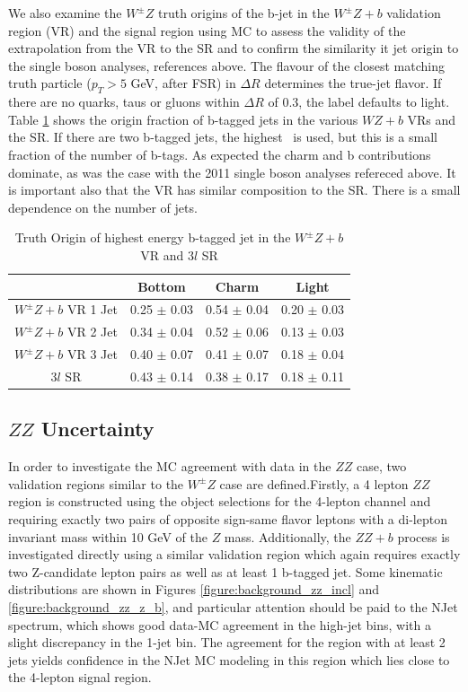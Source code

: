 We also examine the $W^{\pm}Z$ truth origins of the b-jet in the $W^{\pm}Z+b$ validation region (VR) and the signal region using MC to assess the validity of the extrapolation from the VR to the SR and to confirm the similarity it jet origin to the single boson analyses, references above. The flavour of the closest matching truth particle ($p_T > 5$ GeV, after FSR) in $\Delta R$ determines the true-jet flavor. If there are no quarks, taus or gluons within $\Delta R$ of 0.3, the label defaults to light.  Table \ref{table:wz_truth} shows the origin fraction of b-tagged jets in the various $WZ+b$ VRs and the SR. If there are two b-tagged jets, the highest \pt\ is used, but this is a small fraction of the number of b-tags. As expected the charm and b contributions dominate, as was the case with the 2011 single boson analyses refereced above. It is important also that the VR has similar composition to the SR.  There is a small dependence on the number of jets. 

\begin{table}[htbp]
\centering 
\begin{tabular}{|c|c|c|c|} 
  \hline
  & Bottom  & Charm & Light \\
  \hline
  $W^{\pm}Z+b$ VR 1 Jet& 0.25 $\pm$ 0.03 & 0.54  $\pm$ 0.04 & 0.20 $\pm$ 0.03 \\ 
  $W^{\pm}Z+b$ VR 2 Jet& 0.34 $\pm$ 0.04 & 0.52  $\pm$ 0.06 & 0.13 $\pm$ 0.03 \\ 
  $W^{\pm}Z+b$ VR 3 Jet& 0.40 $\pm$ 0.07 & 0.41  $\pm$ 0.07 & 0.18 $\pm$ 0.04 \\
  3$l$ SR              & 0.43 $\pm$ 0.14 & 0.38  $\pm$ 0.17 & 0.18 $\pm$ 0.11 \\
  \hline 
\end{tabular}
\caption{Truth Origin of highest energy b-tagged jet in the $W^{\pm}Z+b$ VR and 3$l$ SR} 
\label{table:wz_truth}
\end{table} 

\subsection{$ZZ$ Uncertainty}

In order to investigate the MC agreement with data in the $ZZ$ case, two validation regions similar to the $W^{\pm}Z$ case are defined.Firstly, a 4 lepton $ZZ$ region is constructed using the object selections for the 4-lepton channel and requiring exactly two pairs of 
opposite sign-same flavor leptons with a di-lepton invariant mass within 10 GeV of the $Z$ mass. Additionally, the $ZZ+b$ process 
is investigated directly using a similar validation region which again requires exactly two Z-candidate lepton pairs as well as at least 1 b-tagged jet. Some kinematic distributions are shown in Figures \ref{figure:background_zz_incl} and \ref{figure:background_zz_z_b}, and particular attention should be paid to the NJet spectrum, which shows good data-MC agreement in the high-jet bins, with a slight discrepancy in the 1-jet bin. The agreement for the region with at least 2 jets yields confidence in the NJet MC modeling in this region which lies close to the 4-lepton signal region. 

